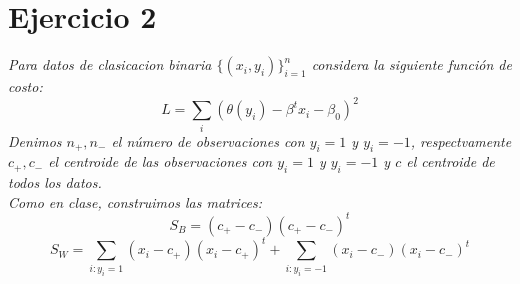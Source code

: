 \documentclass[paper=letter, fontsize=11pt]{scrartcl}
\numberwithin{equation}{section} %
\numberwithin{figure}{section} %
\numberwithin{table}{section} %
\begin{document}
\section{Ejercicio 2}
\textit{Para datos de clasicacion binaria $\{(x_i, y_i)\}_{i=1}^n$ considera la siguiente función de costo:}
\begin{equation}
L = \sum_{i}(\theta(y_i)-\beta^tx_i-\beta_0)^2
\end{equation}
\textit{Denimos $n_+,n_-$ el número de observaciones con $y_i = 1$ y $y_i = -1$, respectvamente $c_+, c_-$ el centroide de las observaciones con $y_i = 1$ y $y_i = -1$ y $c$ el centroide de todos los datos.\\
Como en clase, construimos las matrices:}
\[
S_B = (c_+ - c_-)(c_+ - c_-)^t
\]
\[
S_W = \sum_{i:y_i=1}(x_i - c_+)(x_i - c_+)^t + \sum_{i:y_i=-1}(x_i - c_-)(x_i - c_-)^t
\]
\end{document}
